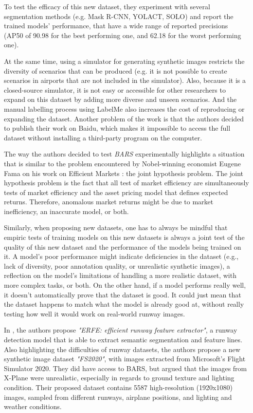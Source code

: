 To test the efficacy of this new dataset, they experiment with several segmentation methods (e.g. Mask R-CNN, YOLACT, SOLO) and report the trained models' performance, that have a wide range of reported precisions (AP50 of 90.98 for the best performing one, and 62.18 for the worst performing one).

At the same time, using a simulator for generating synthetic images restricts the diversity of scenarios that can be produced (e.g. it is not possible to create scenarios in airports that are not included in the simulator). Also, because it is a closed-source simulator, it is not easy or accessible for other researchers to expand on this dataset by adding more diverse and unseen scenarios. And the manual labelling process using LabelMe \cite{mit_labelme_nodate} also increases the cost of reproducing or expanding the dataset. Another problem of the work is that the authors decided to publish their work on Baidu, which makes it impossible to access the full dataset without installing a third-party program on the computer.

The way the authors decided to test \emph{BARS} experimentally highlights a situation that is similar to the problem encountered by Nobel-winning economist Eugene Fama on his work on Efficient Markets \cite{fama_efficient_1970} : the joint hypothesis problem. The joint hypothesis problem is the fact that all test of market efficiency are simultaneously tests of market efficiency and the asset pricing model that defines expected returns. Therefore, anomalous market returns might be due to market inefficiency, an inaccurate model, or both. 

Similarly, when proposing new datasets, one has to always be mindful that empiric tests of training models on this new datasets is always a joint test of the quality of this new dataset and the performance of the models being trained on it. A model's poor performance might indicate deficiencies in the dataset (e.g., lack of diversity, poor annotation quality, or unrealistic synthetic images), a reflection on the model's limitations of handling a more realistic dataset, with more complex tasks, or both. On the other hand, if a model performs really well, it doesn't automatically prove that the dataset is good. It could just mean that the dataset happens to match what the model is already good at, without really testing how well it would work on real-world runway images.

In \cite{chen_image-based_2024}, the authors propose \emph{"ERFE: efficient runway feature extractor"}, a runway detection model that is able to extract semantic segmentation and feature lines. Also highlighting the difficulties of runway datasets, the authors propose a new synthetic image dataset \emph{"FS2020"}, with images extracted from Microsoft's Flight Simulator 2020. They did have access to BARS, but argued that the images from X-Plane were unrealistic, especially in regards to ground texture and lighting condition. Their proposed dataset contains 5587 high-resolution (1920x1080) images, sampled from different runways, airplane positions, and lighting and weather conditions.

